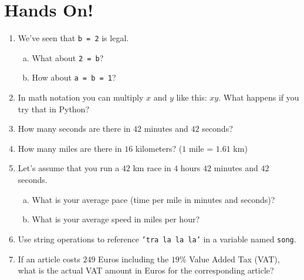 \documentclass[aspectratio=1610,slidestop]{beamer}
\begin{document}
\section{Hands On!}
\begin{pframe}
 \vspace{-0.5cm}
 \begin{enumerate}
  \item We've seen that \texttt{b = 2} is legal.
  \begin{enumerate}[a.]
   \item What about \texttt{2 = b}?
   \item How about \texttt{a = b = 1}?
  \end{enumerate}
  \item In math notation you can multiply $x$ and $y$ like this: $xy$. What
  happens if you try that in Python?
  \item How many seconds are there in $42$ minutes and $42$ seconds?
  \item How many miles are there in $16$ kilometers? ($1$ mile = $1.61$ km)
  \item Let's assume that you run a $42$ km race in $4$ hours $42$ minutes and
  $42$ seconds.
  \begin{enumerate}[a.]
   \item What is your average pace (time per mile in minutes and seconds)?
   \item What is your average speed in miles per hour?
  \end{enumerate}
  \item Use string operations to reference \texttt{'tra la la la'}
  in a variable named \texttt{song}.
  \item If an article costs $249$ Euros including the $19\%$ Value Added Tax
  (VAT), what is the actual VAT amount in Euros for the corresponding article?
 \end{enumerate}
\end{pframe}


\end{document}
